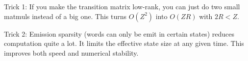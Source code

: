 \documentclass{article}
\begin{document}
Trick 1: If you make the transition matrix low-rank, you can just do two small matmuls instead of a big one.
This turns $O(Z^2)$ into $O(ZR)$ with $2R < Z$.

Trick 2: Emission sparsity (words can only be emit in certain states) reduces computation quite a lot.
It limits the effective state size at any given time.
This improves both speed and numerical stability.

\begin{center}
\resizebox{0.8\width}{0.8\height}{

}
\end{center}
\end{document}
